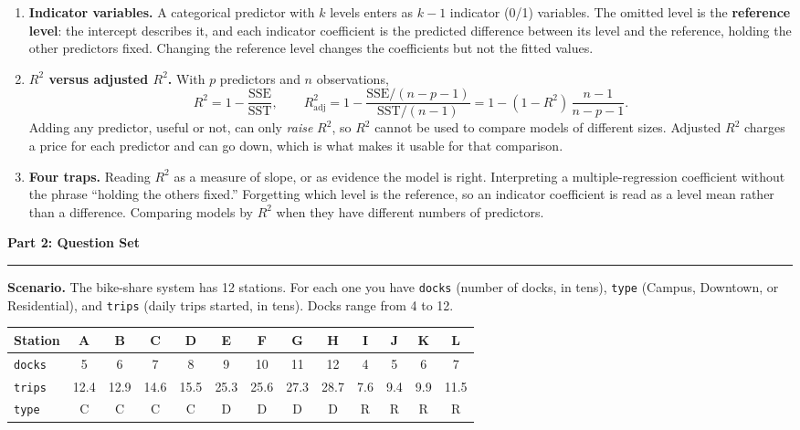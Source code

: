 \documentclass[11pt]{article}
\newcommand{\parttitle}[1]{%
  \par\medskip\noindent
  {\large\bfseries #1}\par
  \vspace{-.5em}\noindent\rule{\linewidth}{0.4pt}\par\smallskip}
\begin{document}
{\begin{enumerate}[label=\textbf{\arabic*.}, wide=0pt, itemsep=.55em, topsep=.5em]
\item \textbf{Indicator variables.} A categorical predictor with $k$ levels enters as $k-1$
indicator (0/1) variables. The omitted level is the \textbf{reference level}: the intercept
describes it, and each indicator coefficient is the predicted difference between its level and the
reference, holding the other predictors fixed. Changing the reference level changes the
coefficients but not the fitted values.

\item \textbf{$R^2$ versus adjusted $R^2$.} With $p$ predictors and $n$ observations,
\[
R^2 = 1 - \frac{\text{SSE}}{\text{SST}},
\qquad
R^2_{\text{adj}} = 1 - \frac{\text{SSE}/(n-p-1)}{\text{SST}/(n-1)}
= 1 - (1-R^2)\,\frac{n-1}{n-p-1}.
\]
Adding any predictor, useful or not, can only \emph{raise} $R^2$, so $R^2$ cannot be used to
compare models of different sizes. Adjusted $R^2$ charges a price for each predictor and can go
down, which is what makes it usable for that comparison.

\item \textbf{Four traps.} Reading $R^2$ as a measure of slope, or as evidence the model is right.
Interpreting a multiple-regression coefficient without the phrase ``holding the others fixed.''
Forgetting which level is the reference, so an indicator coefficient is read as a level mean
rather than a difference. Comparing models by $R^2$ when they have different numbers of
predictors.

\end{enumerate}

}

\newpage

\parttitle{Part 2: Question Set}

\noindent\textbf{Scenario.} The bike-share system has 12 stations. For each one you have
\texttt{docks} (number of docks, in tens), \texttt{type} (Campus, Downtown, or Residential), and
\texttt{trips} (daily trips started, in tens). Docks range from 4 to 12.

\begin{center}
\renewcommand{\arraystretch}{1.15}
\begin{tabular}{lcccccccccccc}
\toprule
\textbf{Station} & A & B & C & D & E & F & G & H & I & J & K & L \\
\midrule
\texttt{docks} & 5 & 6 & 7 & 8 & 9 & 10 & 11 & 12 & 4 & 5 & 6 & 7 \\
\texttt{trips} & 12.4 & 12.9 & 14.6 & 15.5 & 25.3 & 25.6 & 27.3 & 28.7 & 7.6 & 9.4 & 9.9 & 11.5 \\
\texttt{type} & C & C & C & C & D & D & D & D & R & R & R & R \\
\bottomrule
\end{tabular}
\end{center}
\end{document}
